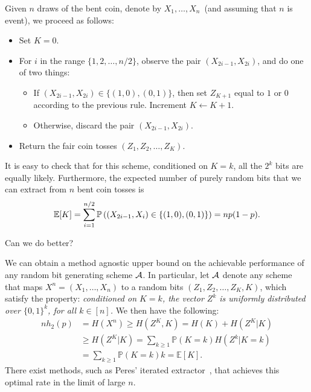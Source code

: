              Given $n$ draws of the bent coin, denote by $X_1, \ldots, X_n$~(and assuming that $n$ is event), we proceed as follows: 
             \begin{itemize}
                 \item Set $K=0$. 
                 \item For $i$ in the range $\{1, 2, \ldots, n/2\}$, observe the pair $(X_{2i-1}, X_{2i})$, and do one of two things:
                 \begin{itemize}
                     \item If $(X_{2i-1}, X_{2i}) \in \{(1, 0), (0, 1)\}$, then set $Z_{K+1}$ equal to $1$ or $0$ according to the previous rule. Increment $K \leftarrow K+1$. 
                     \item Otherwise, discard the pair $(X_{2i-1}, X_{2i})$. 
                 \end{itemize}
                 \item Return the fair coin tosses $(Z_1, Z_2, \ldots, Z_K)$. 
             \end{itemize}

             It is easy to check that for this scheme, conditioned on $K=k$, all the $2^k$ bits are equally likely. Furthermore, the expected number of purely random bits that we can extract from $n$ bent coin tosses is 
             \begin{align}
                 \mathbb{E}[K] = \sum_{i=1}^{n/2} \mathbb{P}\left( (X_{2i-1}, X_i) \in \{(1,0), (0, 1)\} \right) = n p(1-p). 
             \end{align}

            \begin{question}
                \label{question:random-bits-3} Can we do better? 
            \end{question}

                We can obtain a method agnostic upper bound on the achievable performance of any random bit generating scheme $\mathcal{A}$. In particular, let $\mathcal{A}$ denote any scheme that maps $X^n = (X_1, \ldots, X_n)$ to a random bits $(Z_1, Z_2, \ldots, Z_K, K)$, which satisfy the property: \emph{conditioned on $K=k$, the vector $Z^k$ is uniformly distributed over $\{0, 1\}^k$, for all $k \in [n]$.} We then have the following: 
                \begin{align}
                    n h_2(p) &= H(X^n) \geq H(Z^K, K) = H(K) + H(Z^K|K)  \\
                    & \geq H(Z^K|K) = \sum_{k\geq 1} \mathbb{P}(K=k) H(Z^k|K=k) \\
                    & = \sum_{k\geq 1} \mathbb{P}(K=k) k  
                     = \mathbb{E}[K]. 
                \end{align}
                There exist methods, such as Peres' iterated extractor~\citep{peres1992iterating}, that achieves this optimal rate in the limit of large $n$.  
                   
